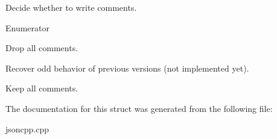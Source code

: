 Decide whether to write comments. 

\begin{Desc}
\item[Enumerator]\par
\begin{description}
\item[{\em 
\hypertarget{struct_json_1_1_comment_style_a51fc08f3518fd81eba12f340d19a3d0cac8b32a8bae63414c8647d4919da8d437}{None}\label{struct_json_1_1_comment_style_a51fc08f3518fd81eba12f340d19a3d0cac8b32a8bae63414c8647d4919da8d437}
}]Drop all comments. \item[{\em 
\hypertarget{struct_json_1_1_comment_style_a51fc08f3518fd81eba12f340d19a3d0cac65238f050773c107690a456e9c05c98}{Most}\label{struct_json_1_1_comment_style_a51fc08f3518fd81eba12f340d19a3d0cac65238f050773c107690a456e9c05c98}
}]Recover odd behavior of previous versions (not implemented yet). \item[{\em 
\hypertarget{struct_json_1_1_comment_style_a51fc08f3518fd81eba12f340d19a3d0ca32302c0b97190c1808b3e38f367fef01}{All}\label{struct_json_1_1_comment_style_a51fc08f3518fd81eba12f340d19a3d0ca32302c0b97190c1808b3e38f367fef01}
}]Keep all comments. \end{description}
\end{Desc}


The documentation for this struct was generated from the following file\-:\begin{DoxyCompactItemize}
\item 
jsoncpp.\-cpp\end{DoxyCompactItemize}
